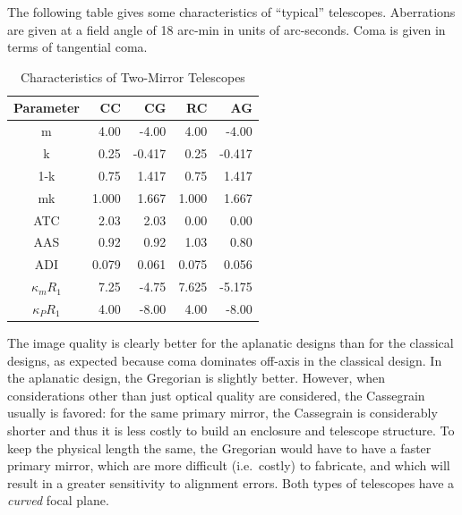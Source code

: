 \documentclass[12pt]{article}
\begin{document}
The following table gives some characteristics of ``typical''
telescopes. Aberrations are given at a field angle of 18 arc-min in
units of arc-seconds. Coma is given in terms of tangential coma.

\begin{table}[h]
    \centering
    \begin{tabular}{c r r r r}
        Parameter & CC & CG & RC & AG\\
        \hline\hline
        m & 4.00 & -4.00 & 4.00 & -4.00\\
        k & 0.25 & -0.417 & 0.25 & -0.417\\
        1-k & 0.75 & 1.417 & 0.75 & 1.417\\
        mk & 1.000 & 1.667 & 1.000 & 1.667\\
        ATC & 2.03 & 2.03 & 0.00 & 0.00\\
        AAS & 0.92 & 0.92 & 1.03 & 0.80\\
        ADI & 0.079 & 0.061 & 0.075 & 0.056\\
        $\kappa_{m}R_{1}$ & 7.25 & -4.75 & 7.625 & -5.175\\
        $\kappa_{P}R_{1}$ & 4.00 & -8.00 & 4.00 & -8.00\\
        \hline
    \end{tabular}
    \caption{Characteristics of Two-Mirror Telescopes}
\end{table}

The image quality is clearly better for the aplanatic designs than for the
classical designs, as expected because coma dominates off-axis in the classical
design. In the aplanatic design, the Gregorian is slightly better. However,
when considerations other than just optical quality are considered, the
Cassegrain usually is favored: for the same primary mirror, the Cassegrain is
considerably shorter and thus it is less costly to build an enclosure and
telescope structure. To keep the physical length the same, the Gregorian would
have to have a faster primary mirror, which are more difficult (i.e.\ costly)
to fabricate, and which will result in a greater sensitivity to alignment
errors. Both types of telescopes have a \emph{curved} focal plane.
\end{document}
